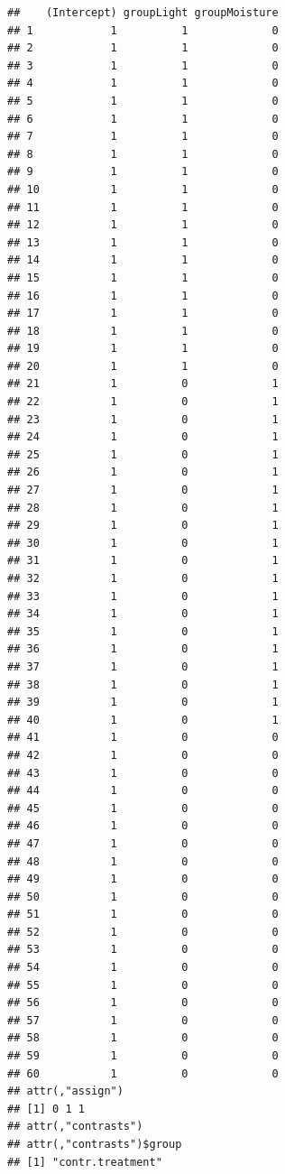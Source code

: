 \documentclass[
]{article}
\begin{document}
\begin{verbatim}
##    (Intercept) groupLight groupMoisture
## 1            1          1             0
## 2            1          1             0
## 3            1          1             0
## 4            1          1             0
## 5            1          1             0
## 6            1          1             0
## 7            1          1             0
## 8            1          1             0
## 9            1          1             0
## 10           1          1             0
## 11           1          1             0
## 12           1          1             0
## 13           1          1             0
## 14           1          1             0
## 15           1          1             0
## 16           1          1             0
## 17           1          1             0
## 18           1          1             0
## 19           1          1             0
## 20           1          1             0
## 21           1          0             1
## 22           1          0             1
## 23           1          0             1
## 24           1          0             1
## 25           1          0             1
## 26           1          0             1
## 27           1          0             1
## 28           1          0             1
## 29           1          0             1
## 30           1          0             1
## 31           1          0             1
## 32           1          0             1
## 33           1          0             1
## 34           1          0             1
## 35           1          0             1
## 36           1          0             1
## 37           1          0             1
## 38           1          0             1
## 39           1          0             1
## 40           1          0             1
## 41           1          0             0
## 42           1          0             0
## 43           1          0             0
## 44           1          0             0
## 45           1          0             0
## 46           1          0             0
## 47           1          0             0
## 48           1          0             0
## 49           1          0             0
## 50           1          0             0
## 51           1          0             0
## 52           1          0             0
## 53           1          0             0
## 54           1          0             0
## 55           1          0             0
## 56           1          0             0
## 57           1          0             0
## 58           1          0             0
## 59           1          0             0
## 60           1          0             0
## attr(,"assign")
## [1] 0 1 1
## attr(,"contrasts")
## attr(,"contrasts")$group
## [1] "contr.treatment"
\end{verbatim}
\end{document}
